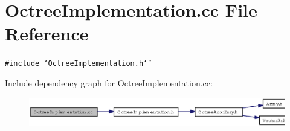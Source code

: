 \section{Octree\-Implementation.cc File Reference}
\label{OctreeImplementation_8cc}
{\tt \#include \char`\"{}Octree\-Implementation.h\char`\"{}}\par


Include dependency graph for Octree\-Implementation.cc:\begin{figure}[H]
\begin{center}
\leavevmode
\includegraphics[width=362pt]{OctreeImplementation_8cc__incl}
\end{center}
\end{figure}
